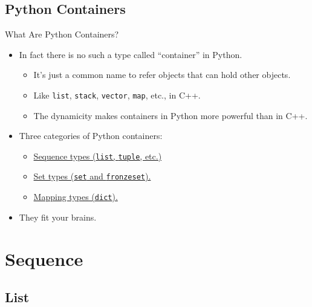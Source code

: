 \documentclass[dvips,xcolor=pst,14pt]{beamer}
\begin{document}
\subsection{
Python Containers
}

\begin{frame}[fragile]{
%
What Are Python Containers?
%
}
\begin{itemize}
\item In fact there is no such a type called ``container'' in Python.
  \begin{itemize}
  \item It's just a common name to refer objects that can hold other objects.
  \item Like \verb+list+, \verb+stack+, \verb+vector+, \verb+map+, etc., in
  C++.
  \item The dynamicity makes containers in Python more powerful than in C++.
  \end{itemize}
\item Three categories of Python containers:
\begin{itemize}
  \item \href{http://docs.python.org/2/library/stdtypes.html#sequence-types-str-unicode-list-tuple-bytearray-buffer-xrange}{%
    Sequence types (\texttt{list}, \texttt{tuple}, etc.)}
  \item \href{http://docs.python.org/2/library/stdtypes.html#set-types-set-frozenset}{%
    Set types (\texttt{set} and \texttt{fronzeset}).}
  \item \href{http://docs.python.org/2/library/stdtypes.html#mapping-types-dict}{%
    Mapping types (\texttt{dict}).}
\end{itemize}
\item They fit your brains.
\end{itemize}
\end{frame}

\section{
Sequence
}

\subsection{
List
}
\end{document}
